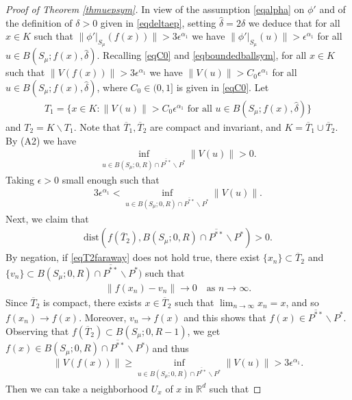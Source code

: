 \documentclass[10pt,a4paper]{article}
\theoremstyle{definition} \theoremstyle{remark}
\numberwithin{equation}{section}
\newcommand{\R}{\mathbb{R}}
\newcommand{\ep}{\epsilon}
\begin{document}
\begin{proof}[Proof of Theorem \ref{thmuepsym}]
	In view of the assumption \eqref{eqalpha} on $\phi'$ and of the definition of $\delta > 0$ given in \eqref{eqdeltaep}, setting $\hat \delta = 2\delta$ we deduce that for all $x \in K$ such that $\|\phi'|_{S_\mu}(f(x))\| > 3\ep^{\alpha_1}$ we have $\|\phi'|_{S_\mu}(u)\| > \ep^{\alpha_1}$ for all $u \in B(S_\mu; f(x), \hat \delta)$. Recalling \eqref{eqC0} and \eqref{eqboundedballsym}, for all $x \in K$ such that $\|V(f(x))\| > 3\ep^{\alpha_1}$ we have $\|V(u)\| > C_0\ep^{\alpha_1}$ for all $u \in B(S_\mu; f(x), \hat \delta)$, where $C_0 \in (0,1]$ is given in \eqref{eqC0}. Let
	\begin{align*}
		T_1 = \bigl\{x \in K: \|V(u)\| > C_0\ep^{\alpha_1} \text{ for all } u \in B(S_\mu; f(x), \hat \delta)\bigr\}
	\end{align*}
	and $T_2 = K\backslash T_1$. Note that $\overline{T}_1, \overline{T}_2$ are compact and invariant, and $K = \overline{T}_1 \cup \overline{T}_2$. By (A2) we have
	\begin{align*}
		\inf_{u \in B(S_\mu;0,R) \cap \overline{P^{**}} \backslash P^*}\|V(u)\| > 0.
	\end{align*}
	Taking $\ep > 0$ small enough such that
	\begin{align*}
		3\ep^{\alpha_1} < \inf_{u \in B(S_\mu;0,R) \cap \overline{P^{**}} \backslash P^*}\|V(u)\|.
	\end{align*}
	Next, we claim that
	\begin{align} \label{eqT2faraway}
		\text{dist}(f(\overline{T}_2),B(S_\mu;0,R) \cap \overline{P^{**}} \backslash P^*) > 0.
	\end{align}
	By negation, if \eqref{eqT2faraway} does not hold true, there exist $\{x_n\} \subset \overline{T}_2$ and $\{v_n\} \subset B(S_\mu;0,R) \cap \overline{P^{**}} \backslash P^*)$ such that
	\begin{align*}
		\|f(x_n) - v_n\| \to 0 \quad \text{as } n \to \infty.
	\end{align*}
	Since $\overline{T}_2$ is compact, there exists $x \in \overline{T}_2$ such that $\lim_{n \to \infty}x_n = x$, and so $f(x_n) \to f(x)$. Moreover, $v_n \to f(x)$ and this shows that $f(x) \in \overline{P^{**}} \backslash P^*$. Observing that $f(\overline{T}_2) \subset B(S_\mu;0,R-1)$, we get $f(x) \in B(S_\mu;0,R) \cap \overline{P^{**}} \backslash P^*)$ and thus
	\begin{align*}
		\|V(f(x))\| \geq \inf_{u \in B(S_\mu;0,R) \cap \overline{P^{**}} \backslash P^*}\|V(u)\| > 3\ep^{\alpha_1}.
	\end{align*}
	Then we can take a neighborhood $U_x$ of $x$ in $\R^d$ such that

\end{proof}
\end{document}
